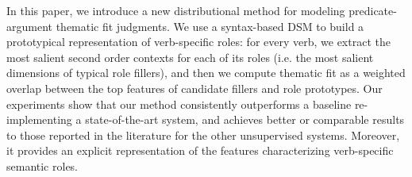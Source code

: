 In this paper, we introduce a new distributional method for modeling predicate-argument thematic fit judgments. We use a syntax-based DSM to build a prototypical representation of verb-specific roles: for every verb, we extract the most salient second order contexts for each of its roles (i.e. the most salient dimensions of typical role fillers), and then we compute thematic fit as a weighted overlap between the top features of candidate fillers and role prototypes. Our experiments show that our method consistently outperforms a baseline re-implementing a state-of-the-art system, and achieves better or comparable results to those reported in the literature for the other unsupervised systems. Moreover, it provides an explicit representation of the features characterizing verb-specific semantic roles.

